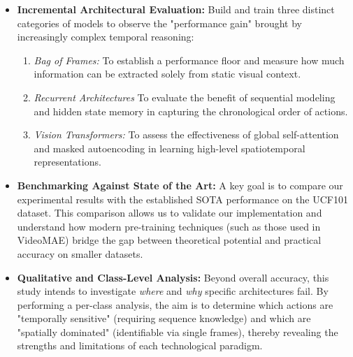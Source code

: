 \begin{itemize}
    \item \textbf{Incremental Architectural Evaluation:} Build and train three distinct categories of models to observe the "performance gain" brought by increasingly complex temporal reasoning:
    \begin{enumerate}
        \item \textit{Bag of Frames:} To establish a performance floor and measure how much information can be extracted solely from static visual context.
        \item \textit{Recurrent Architectures} To evaluate the benefit of sequential modeling and hidden state memory in capturing the chronological order of actions.
        \item \textit{Vision Transformers:} To assess the effectiveness of global self-attention and masked autoencoding in learning high-level spatiotemporal representations.
    \end{enumerate}
    
    \item \textbf{Benchmarking Against State of the Art:} A key goal is to compare our experimental results with the established SOTA performance on the UCF101 dataset. This comparison allows us to validate our implementation and understand how modern pre-training techniques (such as those used in VideoMAE) bridge the gap between theoretical potential and practical accuracy on smaller datasets.
    
    \item \textbf{Qualitative and Class-Level Analysis:} Beyond overall accuracy, this study intends to investigate \textit{where} and \textit{why} specific architectures fail. By performing a per-class analysis, the aim is to determine which actions are "temporally sensitive" (requiring sequence knowledge) and which are "spatially dominated" (identifiable via single frames), thereby revealing the strengths and limitations of each technological paradigm.
\end{itemize}